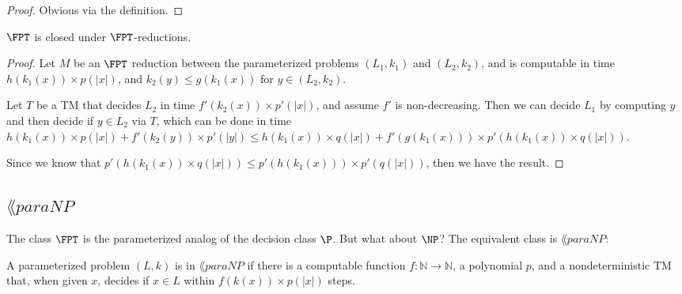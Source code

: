 \begin{proof}
Obvious via the definition.
\end{proof}

\begin{theorem}
$\FPT$ is closed under $\FPT$-reductions.
\end{theorem}

\begin{proof}
Let $M$ be an $\FPT$ reduction between the parameterized problems $(L_1, k_1)$ and $(L_2, k_2)$, and is computable in time $h(k_1(x)) \times p(|x|)$, and $k_2(y) \le g(k_1(x))$ for $y \in (L_2, k_2)$. 

\par Let $T$ be a TM that decides $L_2$ in time $f'(k_2(x)) \times p'(|x|)$, and assume $f'$ is non-decreasing. Then we can decide $L_1$ by computing $y$ and then decide if $y \in L_2$ via $T$, which can be done in time $h(k_1(x)) \times p(|x|) + f'(k_2(y)) \times p'(|y|) \le h(k_1(x)) \times q(|x|) + f'(g(k_1(x))) \times p'(h(k_1(x)) \times q(|x|))$.

\par Since we know that $p'(h(k_1(x)) \times q(|x|)) \le p'(h(k_1(x))) \times p'(q(|x|))$, then we have the result. 
\end{proof}

\newcommand{\paraNP}{\lang{paraNP}}
\subsection{$\paraNP$}
The class $\FPT$ is the parameterized analog of the decision class $\P$. But what about $\NP$? The equivalent class is $\paraNP$:
\begin{definition}
A parameterized problem $(L, k)$ is in $\paraNP$ if there is a computable function $f: \mathbb{N} \rightarrow \mathbb{N}$, a polynomial $p$, and a nondeterministic TM that, when given $x$, decides if $x \in L$ within $f(k(x)) \times p(|x|)$ steps.
\end{definition}

